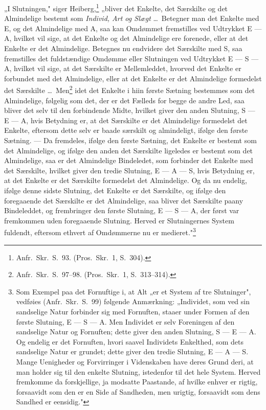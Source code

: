 \documentclass[12pt]{book}
\newcommand{\opage}[1]{\marginnote{\footnotesize\textit{[#1]}}}
\begin{document}
„I Slutningen," siger Heiberg,\footnote{Anfr.\ Skr.\ S.~93. (Pros.\ Skr.\ 1, S.~304).} „bliver det
Enkelte, det Særskilte og det Almindelige bestemt som \emph{Individ, Art og Slægt} \dots\ Betegner
man det Enkelte med E, og det Almindelige med A, saa kan Omdømmet fremstilles ved Udtrykket E --- A,
hvilket vil sige, at det Enkelte og det Almindelige ere forenede, eller at det Enkelte er det
Almindelige. Betegnes nu endvidere det Særskilte med S, saa fremstilles det fuldstændige Omdømme
eller Slutningen ved Udtrykket E --- S --- A, hvilket vil sige, at det Særskilte er Mellemleddet,
hvorved det Enkelte er forbundet med det Almindelige, eller at det Enkelte er det Almindelige
formedelst det Særskilte \dots\ Men\footnote{Anfr.\ Skr.\ S.~97--98. (Pros.\ Skr.\ 1, S.~313--314).}
idet det Enkelte i hiin første Sætning bestemmes som det Almindelige, følgelig som det, der er det
Fælleds for begge de andre Led, saa bliver det selv til den forbindende Midte, hvilket giver den
anden Slutning, S --- E --- A, hvis Betydning er, at det Særskilte er det Almindelige formedelst det
Enkelte, eftersom dette selv er baade særskilt og
\opage{215} almindeligt, ifølge den første Sætning. --- Da fremdeles, ifølge den første Sætning, det Enkelte er
bestemt som det Almindelige, og ifølge den anden det Særskilte ligeledes er bestemt som det
Almindelige, saa er det Almindelige Bindeledet, som forbinder det Enkelte med det Særskilte, hvilket
giver den tredie Slutning, E --- A --- S, hvis Betydning er, at det Enkelte er det Særskilte
formedelst det Almindelige. Og da nu endelig, ifølge denne sidste Slutning, det Enkelte er det
Særskilte, og ifølge den foregaaende det Særskilte er det Almindelige, saa bliver det Særskilte
paany Bindeleddet, og frembringer den første Slutning, E --- S --- A, der først var fremkommen uden
foregaaende Slutning. Herved er Slutningernes System fuldendt, eftersom ethvert af Omdømmerne nu er
medieret."\footnote{Som Exempel paa det Fornuftige i, at Alt „er et System af tre Slutninger",
vedføies (Anfr.\ Skr.\ S.~99) følgende Anmærkning: „Individet, som ved sin sandselige Natur
forbinder sig med Fornuften, staaer under Formen af den første Slutning, E --- S --- A. Men
Individet er selv Foreningen af den sandselige Natur og Fornuften; dette giver den anden Slutning,
S --- E --- A. Og endelig er det Fornuften, hvori saavel Individets Enkelthed, som dets sandselige
Natur er grundet; dette giver den tredie Slutning, E --- A --- S. Mange Uenigheder og Forvirringer i
Videnskaben have deres Grund deri, at man holder sig til den enkelte Slutning, istedenfor til det
hele System. Herved fremkomme da forskjellige, ja modsatte Paastande, af hvilke enhver er rigtig,
forsaavidt som den er en Side af Sandheden, men urigtig, forsaavidt som dens Sandhed er eensidig."}
\end{document}

